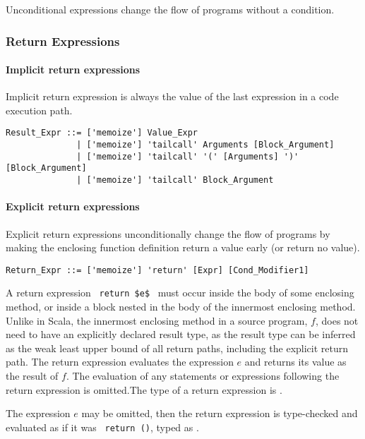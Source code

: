 Unconditional expressions change the flow of programs without a condition. 






\subsubsection{Return Expressions}
\label{sec:return-expressions}

\paragraph{Implicit return expressions}
Implicit return expression is always the value of the last expression in a code execution path. 

\syntax\begin{lstlisting}
Result_Expr ::= ['memoize'] Value_Expr
              | ['memoize'] 'tailcall' Arguments [Block_Argument]
              | ['memoize'] 'tailcall' '(' [Arguments] ')' [Block_Argument]
              | ['memoize'] 'tailcall' Block_Argument
\end{lstlisting}

\paragraph{Explicit return expressions}
Explicit return expressions unconditionally change the flow of programs by making the enclosing function definition return a value early (or return no value). 

\syntax\begin{lstlisting}
Return_Expr ::= ['memoize'] 'return' [Expr] [Cond_Modifier1]
\end{lstlisting}

A return expression ~\lstinline!return $e$!~ must occur inside the body of some enclosing method, or inside a block nested in the body of the innermost enclosing method. Unlike in Scala, the innermost enclosing method in a source program, $f$, does not need to have an explicitly declared result type, as the result type can be inferred as the weak least upper bound of all return paths, including the explicit return path. The return expression evaluates the expression $e$ and returns its value as the result of $f$. The evaluation of any statements or expressions following the return expression is omitted.The type of a return expression is .

The expression $e$ may be omitted, then the return expression  is type-checked and evaluated as if it was ~\lstinline!return ()!, typed as . 

